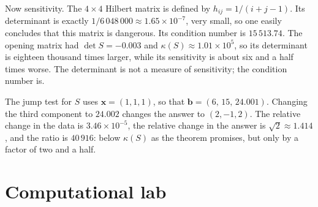 Now sensitivity. The $4\times4$ Hilbert matrix is defined by $h_{ij}=1/(i+j-1)$. Its determinant
is exactly $1/6\,048\,000\approx1.65\times10^{-7}$, very small, so one easily concludes that
this matrix is dangerous. Its condition number is $15\,513.74$. The opening matrix had
$\det S=-0.003$ and $\kappa(S)\approx1.01\times10^{5}$, so its determinant is eighteen
thousand times larger, while its sensitivity is about six and a half times worse. The determinant
is not a measure of sensitivity; the condition number is.

The jump test for $S$ uses $\mathbf{x}=(1,1,1)$, so that $\mathbf{b}=(6,\,15,\,24.001)$.
Changing the third component to $24.002$ changes the answer to $(2,-1,2)$. The relative change
in the data is $3.46\times10^{-5}$, the relative change in the answer is
$\sqrt{2}\approx1.414$, and the ratio is $40\,916$: below $\kappa(S)$ as the theorem promises,
but only by a factor of two and a half.


\section{Computational lab}

